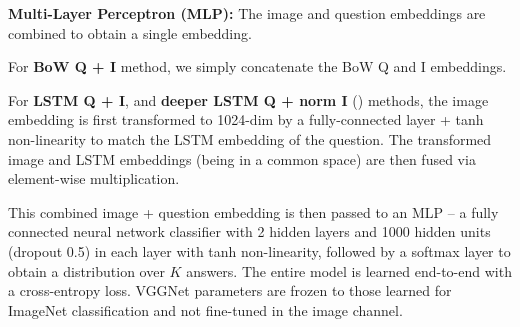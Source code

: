 \textbf{Multi-Layer Perceptron (MLP):} The image and question embeddings 
are combined to obtain a single embedding. 
\begin{compactenum}
\item For \textbf{BoW Q + I} method, we simply concatenate the BoW Q and I embeddings. 
\item For \textbf{LSTM Q + I}, and \textbf{deeper LSTM Q + norm I} () methods, the image embedding is first transformed to 1024-dim by a fully-connected layer + tanh non-linearity to match the LSTM embedding of the question. The transformed image and LSTM embeddings (being in a common space) are then fused via element-wise multiplication. 
\end{compactenum}
This combined image + question embedding is then passed to an MLP -- a fully connected neural network classifier with 2 hidden layers and 1000 hidden units (dropout 0.5) in each layer with tanh non-linearity, followed by a softmax layer to obtain a distribution over $K$ answers. The entire model is learned end-to-end with a cross-entropy loss. VGGNet parameters are frozen to those learned for ImageNet classification and not fine-tuned in the image channel.   


